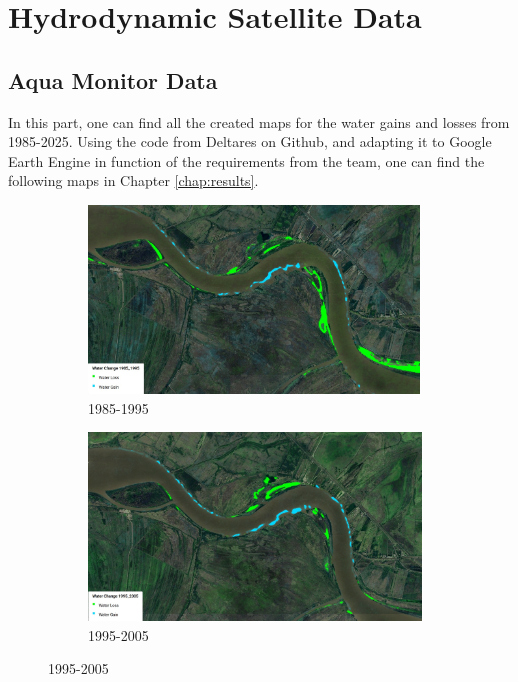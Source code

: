 \chapter{Hydrodynamic Satellite Data}
\label{Appendix: Satellite Data}
\section{Aqua Monitor Data}
In this part, one can find all the created maps for the water gains and losses from 1985-2025. 
Using the code from Deltares on Github, and adapting it to Google Earth Engine in function of the requirements from the team, one can find the following maps in Chapter \ref{chap:results}.

\begin{figure}[H]
    \centering
    \begin{subfigure}[b]{0.48\textwidth}
        \includegraphics[width=\linewidth, height =5cm]{figures/appendix-g/1985-1995.jpg}
        \caption{1985-1995}
        \label{fig:second}
    \end{subfigure}
    \hfill
    \begin{subfigure}[b]{0.48\textwidth}
        \includegraphics[width=\linewidth, height =5cm]{figures/appendix-g/1995-2005.jpg}
        \caption{1995-2005}
        \label{fig:second}
    \end{subfigure}
    

    \vspace{0.5cm}


\end{figure}

